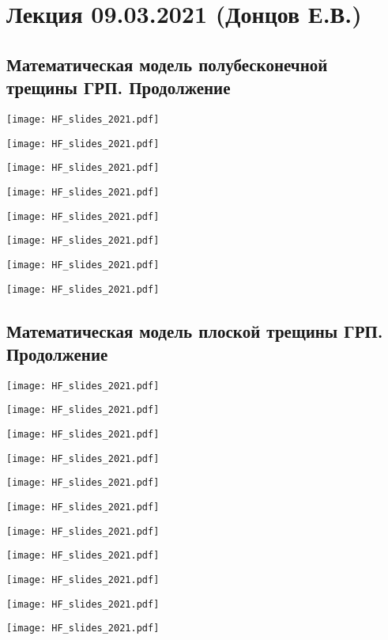 \documentclass[main.tex]{subfiles}
\begin{document}

\section{Лекция 09.03.2021 (Донцов Е.В.)}

\subsection{Математическая модель полубесконечной трещины ГРП. Продолжение}

\texttt{[image: HF\_slides\_2021.pdf]}

\texttt{[image: HF\_slides\_2021.pdf]}

\texttt{[image: HF\_slides\_2021.pdf]}

\texttt{[image: HF\_slides\_2021.pdf]}

\texttt{[image: HF\_slides\_2021.pdf]}

\texttt{[image: HF\_slides\_2021.pdf]}

\texttt{[image: HF\_slides\_2021.pdf]}

\texttt{[image: HF\_slides\_2021.pdf]}

\subsection{Математическая модель плоской трещины ГРП. Продолжение}

\texttt{[image: HF\_slides\_2021.pdf]}

\texttt{[image: HF\_slides\_2021.pdf]}

\texttt{[image: HF\_slides\_2021.pdf]}

\texttt{[image: HF\_slides\_2021.pdf]}

\texttt{[image: HF\_slides\_2021.pdf]}

\texttt{[image: HF\_slides\_2021.pdf]}

\texttt{[image: HF\_slides\_2021.pdf]}

\texttt{[image: HF\_slides\_2021.pdf]}

\texttt{[image: HF\_slides\_2021.pdf]}

\texttt{[image: HF\_slides\_2021.pdf]}

\texttt{[image: HF\_slides\_2021.pdf]}
\end{document}
